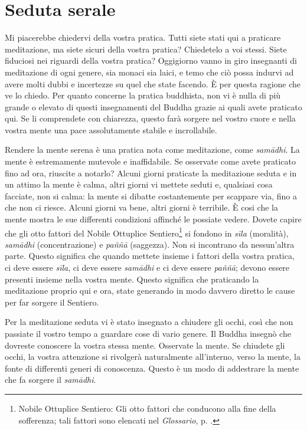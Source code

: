 \chapter{Seduta serale}

Mi piacerebbe chiedervi della vostra pratica. Tutti siete stati qui a
praticare meditazione, ma siete sicuri della vostra pratica? Chiedetelo
a voi stessi. Siete fiduciosi nei riguardi della vostra pratica?
Oggigiorno vanno in giro insegnanti di meditazione di ogni genere, sia
monaci sia laici, e temo che ciò possa indurvi ad avere molti dubbi e
incertezze su quel che state facendo. È per questa ragione che ve lo
chiedo. Per quanto concerne la pratica buddhista, non vi è nulla di più
grande o elevato di questi insegnamenti del Buddha grazie ai quali avete
praticato qui. Se li comprendete con chiarezza, questo farà sorgere nel
vostro cuore e nella vostra mente una pace assolutamente stabile e
incrollabile.

Rendere la mente serena è una pratica nota come meditazione, come
\emph{samādhi}. La mente è estremamente mutevole e inaffidabile. Se
osservate come avete praticato fino ad ora, riuscite a notarlo? Alcuni
giorni praticate la meditazione seduta e in un attimo la mente è calma,
altri giorni vi mettete seduti e, qualsiasi cosa facciate, non si calma:
la mente si dibatte costantemente per scappare via, fino a che non ci
riesce. Alcuni giorni va bene, altri giorni è terribile. È cosi che la
mente mostra le sue differenti condizioni affinché le possiate vedere.
Dovete capire che gli otto fattori del Nobile Ottuplice
Sentiero\footnote{Nobile Ottuplice Sentiero: Gli otto fattori che
  conducono alla fine della sofferenza; tali fattori sono elencati nel
  \emph{Glossario}, p. \pageref{glossary-ottuplice}.} si fondono in \emph{sīla}
(moralità), \emph{samādhi} (concentrazione) e \emph{paññā} (saggezza). Non si incontrano da
nessun'altra parte. Questo significa che quando mettete insieme i
fattori della vostra pratica, ci deve essere \emph{sīla}, ci deve essere
\emph{samādhi} e ci deve essere \emph{paññā}; devono essere presenti
insieme nella vostra mente. Questo significa che praticando la
meditazione proprio qui e ora, state generando in modo davvero diretto
le cause per far sorgere il Sentiero.

Per la meditazione seduta vi è stato insegnato a chiudere gli occhi,
così che non passiate il vostro tempo a guardare cose di vario genere.
Il Buddha insegnò che dovreste conoscere la vostra stessa mente.
Osservate la mente. Se chiudete gli occhi, la vostra attenzione si
rivolgerà naturalmente all'interno, verso la mente, la fonte di
differenti generi di conoscenza. Questo è un modo di addestrare la mente
che fa sorgere il \emph{samādhi}.

